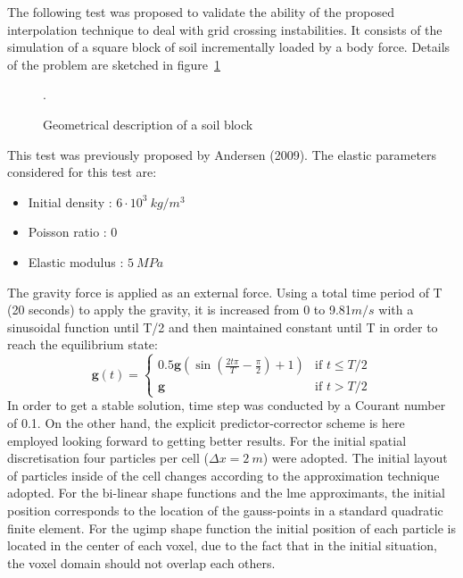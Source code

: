 \documentclass[preprint,12pt,a4paper]{elsarticle}
\begin{document}
The following test was proposed to validate the ability of the proposed
interpolation technique to deal with grid crossing instabilities. It
consists of the simulation of a square block of soil incrementally
loaded by a body force. Details of the problem are sketched in figure~\ref{fig:block}
\begin{figure}
  \centering
  \resizebox{0.7\hsize}{!}{
    }
  \caption{Geometrical description of a soil block }.
  \label{fig:block}
\end{figure}
This test was previously proposed by Andersen (2009)\cite{thesis_Andersen_2009}. The
elastic parameters considered for this test are: 
\begin{itemize} 
\item  Initial density : $6\cdot 10^3\ kg/m^3$
\item  Poisson ratio : $0$
\item  Elastic modulus : $5\ MPa$
\end{itemize}
The gravity force is applied as an external force. Using a total time period of T (20
seconds) to apply the gravity, it is increased from 0 to 9.81$m/s$
with a sinusoidal function until T/2 and then maintained constant until T
in order to reach the equilibrium state:
\begin{equation}
  \label{eq:gravity-load-block}
 \mathbf{g}(t) = \left\{
    \begin{array}{ll}
      0.5 \mathbf{g} (\sin(\frac{2t \pi}{T} - \frac{\pi}{2})+1)  & \mbox{if } t \leq T/2 \\
      \mathbf{g} & \mbox{if } t > T/2
    \end{array}
  \right.
\end{equation}
In order to get a stable solution, time step was conducted by a
Courant number of 0.1. On the other hand, the explicit
predictor-corrector scheme is here employed looking forward to getting better results. For the
initial spatial discretisation four particles per cell
($\Delta x = 2\ m$) were adopted. The initial layout of particles inside of the
cell changes according to the approximation technique adopted. For the
bi-linear shape functions and the \acrshort{lme} approximants, the initial
position corresponds to the location of the gauss-points in a standard
quadratic finite element. For the \acrshort{ugimp} shape function the initial
position of each particle is located in the center of each voxel, due
to the fact that in the initial situation, the voxel domain should not
overlap each others.
\end{document}
